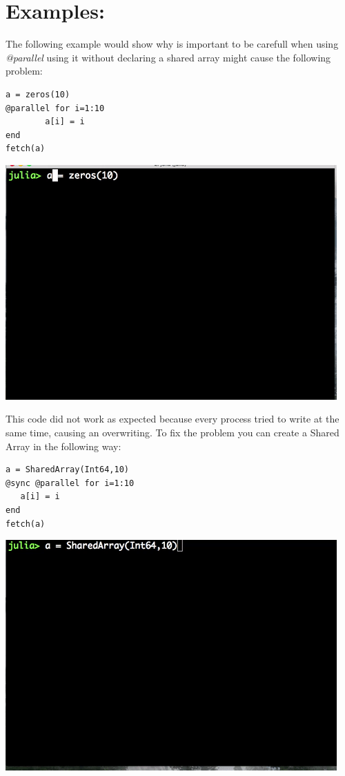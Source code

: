 \documentclass[letterpaper,10pt,english]{sphinxmanual}
\begin{document}
\section{Examples:}
\label{JuliaPar:id1}
The following example would show why is important to be carefull when using \emph{@parallel} using it without declaring a shared array might cause the following problem:

\begin{Verbatim}[commandchars=\\\{\}]
a = zeros(10)
@parallel for i=1:10
        a[i] = i
end
fetch(a)
\end{Verbatim}

\includegraphics{parallel.gif}

This code did not work as expected because every process tried to write at the same time, causing an overwriting. To fix the problem you can create a Shared Array in the following way:

\begin{Verbatim}[commandchars=\\\{\}]
a = SharedArray(Int64,10)
@sync @parallel for i=1:10
   a[i] = i
end
fetch(a)
\end{Verbatim}

\includegraphics{shared.gif}
\end{document}
